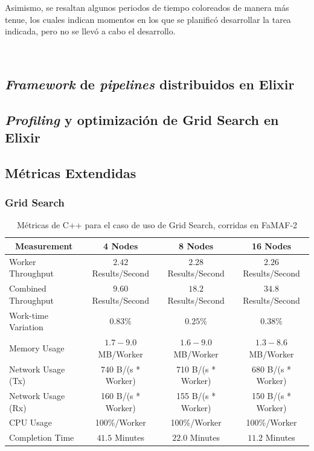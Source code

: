 \documentclass[11pt]{article}
\let\Oldsubsection\subsection
\renewcommand{\subsection}{\FloatBarrier\Oldsubsection}
\let\Oldsubsubsection\subsubsection
\renewcommand{\subsubsection}{\FloatBarrier\Oldsubsubsection}
\newcommand{\gscap}[2]{\caption{Métricas de #1 para el caso de uso de Grid Search, corridas en #2}}
\newcommand{\english}[1]{\textit{#1}}
\begin{document}
Asimismo, se resaltan algunos periodos de tiempo coloreados de manera más tenue, los cuales indican momentos en los que se planificó desarrollar la tarea indicada, pero no se llevó a cabo el desarrollo.

\

\subsection{\english{Framework} de \english{pipelines} distribuidos en Elixir} \label{sec:anex:elixir_pipelines}

\subsection{\english{Profiling} y optimización de Grid Search en Elixir} \label{sec:anex:elixir_gs_optimization}

\subsection{Métricas Extendidas} \label{sec:anex:metrics} 

\subsubsection{Grid Search} \label{sec:anex:metrics:gs}

\begin{table}[H]
\centering
\begin{tabular}{|l|c|c|c|}
\hline
\multicolumn{1}{|c|}{Measurement} & 4 Nodes & 8 Nodes & 16 Nodes \\ \hline
Worker Throughput & $2.42$ Results/Second & $2.28$ Results/Second & $2.26$ Results/Second \\ \hline
Combined Throughput & $9.60$ Results/Second & $18.2$ Results/Second & $34.8$ Results/Second \\ \hline
Work-time Variation & $0.83\%$& $0.25\%$& $0.38\%$\\ \hline
Memory Usage & $1.7-9.0$ MB/Worker & $1.6-9.0$ MB/Worker & $1.3-8.6$ MB/Worker \\ \hline
Network Usage (Tx) & 740 B/(s * Worker) & 710 B/(s * Worker) & 680 B/(s * Worker) \\ \hline
Network Usage (Rx) & 160 B/(s * Worker) & 155 B/(s * Worker) & 150 B/(s * Worker) \\ \hline
CPU Usage & 100\%/Worker & 100\%/Worker & 100\%/Worker \\ \hline
Completion Time & $41.5$ Minutes & $22.0$ Minutes & $11.2$ Minutes \\ \hline
\end{tabular}
\gscap{C++}{FaMAF-2}
\end{table}
\end{document}
